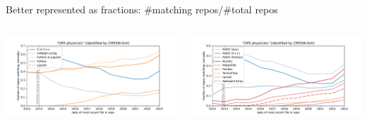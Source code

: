 \documentclass[aspectratio=169]{beamer}
\begin{document}
\begin{frame}{Better represented as fractions: \#matching repos/\#total repos}
\begin{columns}
\hspace{-0.45 cm}\includegraphics[width=1.05\linewidth]{analysis/github-language-cmsswseed-fraction.pdf}

\hspace{-0.75 cm}\includegraphics[width=1.05\linewidth]{analysis/github-package-cmsswseed-fraction.pdf}
\end{columns}

\vspace{-0.08 cm}
\begin{columns}


\end{columns}
\end{frame}
\end{document}
